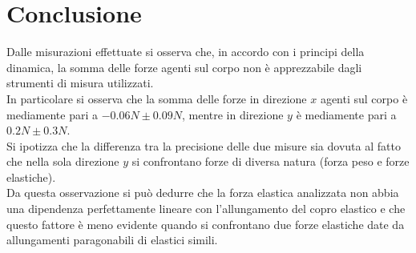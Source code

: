 \section*{Conclusione}

Dalle misurazioni effettuate si osserva che, in accordo con i principi della dinamica, la somma delle forze agenti sul corpo non è apprezzabile dagli strumenti di misura utilizzati.\\
In particolare si osserva che la somma delle forze in direzione $x$ agenti sul corpo è mediamente pari a $-0.06 N \pm 0.09N$, mentre in direzione $y$ è mediamente pari a $0.2 N \pm 0.3N$.\\ 
Si ipotizza che la differenza tra la precisione delle due misure sia dovuta al fatto che nella sola direzione $y$ si confrontano forze di 
diversa natura (forza peso e forze elastiche).\\
Da questa osservazione si può dedurre che la forza elastica analizzata non abbia una dipendenza perfettamente lineare con l'allungamento del copro elastico e che questo fattore è meno evidente quando si 
confrontano due forze elastiche date da allungamenti paragonabili di elastici simili.\\


